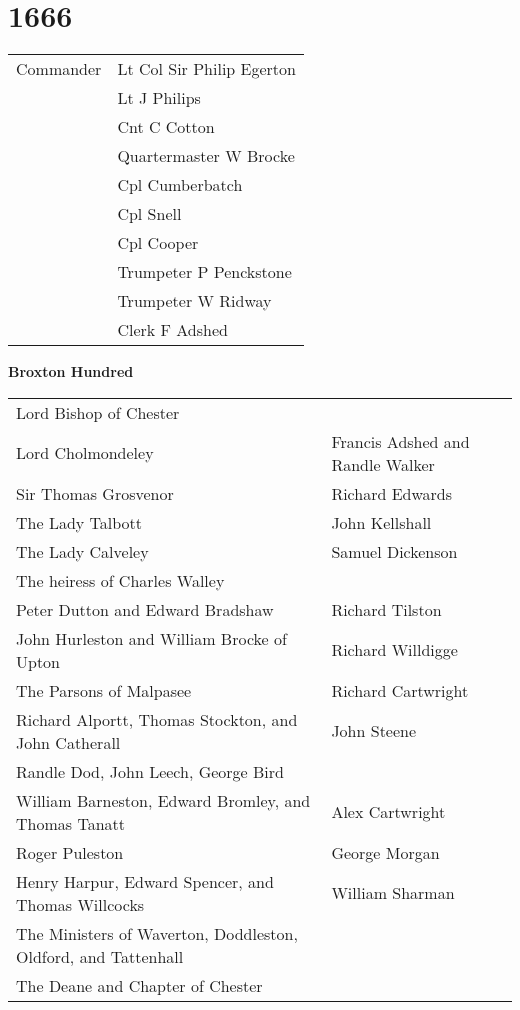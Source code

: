 \chapter*{1666}

\begin{center}
  \begin{tabular}{rl}
    Commander & Lt Col Sir Philip Egerton \\
    & Lt J Philips \\
    & Cnt C Cotton \\
    & Quartermaster W Brocke \\
    & Cpl Cumberbatch \\
    & Cpl Snell \\
    & Cpl Cooper \\
    & Trumpeter P Penckstone \\
    & Trumpeter W Ridway \\
    & Clerk F Adshed \\
  \end{tabular}
\end{center}

\begin{center}
  \Large
  \textbf{Broxton Hundred}
\end{center}

\begin{center}
  \small
  \begin{tabular}{>{\raggedleft}m{5cm} m{5cm} }
    Lord Bishop of Chester & \dotfill \\
    Lord Cholmondeley & Francis Adshed and Randle Walker \\
    Sir Thomas Grosvenor & Richard Edwards \\
    The Lady Talbott & John Kellshall \\
    The Lady Calveley & Samuel Dickenson \\
    The heiress of Charles Walley & \dotfill \\
    Peter Dutton and Edward Bradshaw & Richard Tilston \\
    John Hurleston and William Brocke of Upton & Richard Willdigge \\
    The Parsons of Malpasee & Richard Cartwright \\
    Richard Alportt, Thomas Stockton, and John Catherall & John Steene \\
    Randle Dod, John Leech, George Bird & \\
    William Barneston, Edward Bromley, and Thomas Tanatt & Alex Cartwright \\
    Roger Puleston & George Morgan \\
    Henry Harpur, Edward Spencer, and Thomas Willcocks & William Sharman \\
    The Ministers of Waverton, Doddleston, Oldford, and Tattenhall & \dotfill \\
    The Deane and Chapter of Chester & \dotfill \\
  \end{tabular}
\end{center}


